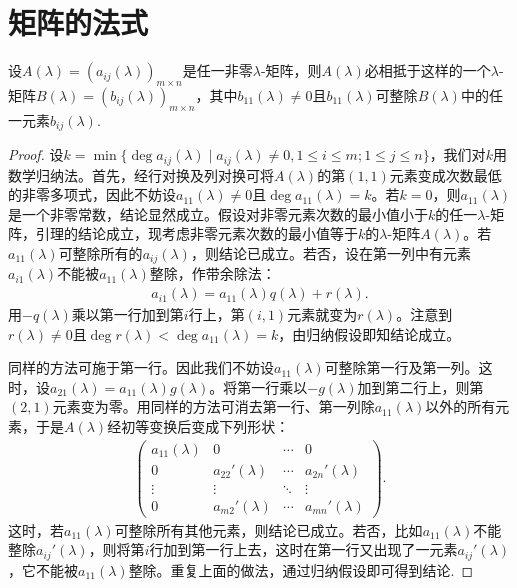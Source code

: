 \documentclass[../../main.tex]{subfiles}%
\begin{document}
\section{矩阵的法式}

\begin{lemma}\label{lemma:lambda矩阵一定相抵于b_11整除所有元素的矩阵}
设$A(\lambda)=(a_{ij}(\lambda))_{m\times n}$是任一非零$\lambda$-矩阵，则$A(\lambda)$必相抵于这样的一个$\lambda$-矩阵$B(\lambda)=(b_{ij}(\lambda))_{m\times n}$，其中$b_{11}(\lambda)\neq 0$且$b_{11}(\lambda)$可整除$B(\lambda)$中的任一元素$b_{ij}(\lambda)$.
\end{lemma}
\begin{proof}
设$k = \min\{\deg a_{ij}(\lambda)\mid a_{ij}(\lambda)\neq 0, 1\leqslant  i\leqslant  m; 1\leqslant  j\leqslant  n\}$，我们对$k$用数学归纳法。首先，经行对换及列对换可将$A(\lambda)$的第$(1,1)$元素变成次数最低的非零多项式，因此不妨设$a_{11}(\lambda)\neq 0$且$\deg a_{11}(\lambda)=k$。若$k = 0$，则$a_{11}(\lambda)$是一个非零常数，结论显然成立。假设对非零元素次数的最小值小于$k$的任一$\lambda$-矩阵，引理的结论成立，现考虑非零元素次数的最小值等于$k$的$\lambda$-矩阵$A(\lambda)$。若$a_{11}(\lambda)$可整除所有的$a_{ij}(\lambda)$，则结论已成立。若否，设在第一列中有元素$a_{i1}(\lambda)$不能被$a_{11}(\lambda)$整除，作带余除法：
\begin{align*}
a_{i1}(\lambda)=a_{11}(\lambda)q(\lambda)+r(\lambda).
\end{align*}
用$-q(\lambda)$乘以第一行加到第$i$行上，第$(i,1)$元素就变为$r(\lambda)$。注意到$r(\lambda)\neq 0$且$\deg r(\lambda)<\deg a_{11}(\lambda)=k$，由归纳假设即知结论成立。

同样的方法可施于第一行。因此我们不妨设$a_{11}(\lambda)$可整除第一行及第一列。这时，设$a_{21}(\lambda)=a_{11}(\lambda)g(\lambda)$。将第一行乘以$-g(\lambda)$加到第二行上，则第$(2,1)$元素变为零。用同样的方法可消去第一行、第一列除$a_{11}(\lambda)$以外的所有元素，于是$A(\lambda)$经初等变换后变成下列形状：
\begin{align*}
\begin{pmatrix}
a_{11}(\lambda)&0&\cdots&0\\
0&a_{22}'(\lambda)&\cdots&a_{2n}'(\lambda)\\
\vdots&\vdots&\ddots&\vdots\\
0&a_{m2}'(\lambda)&\cdots&a_{mn}'(\lambda)
\end{pmatrix}.
\end{align*}
这时，若$a_{11}(\lambda)$可整除所有其他元素，则结论已成立。若否，比如$a_{11}(\lambda)$不能整除$a_{ij}'(\lambda)$，则将第$i$行加到第一行上去，这时在第一行又出现了一元素$a_{ij}'(\lambda)$，它不能被$a_{11}(\lambda)$整除。重复上面的做法，通过归纳假设即可得到结论.
\end{proof}
\end{document}
